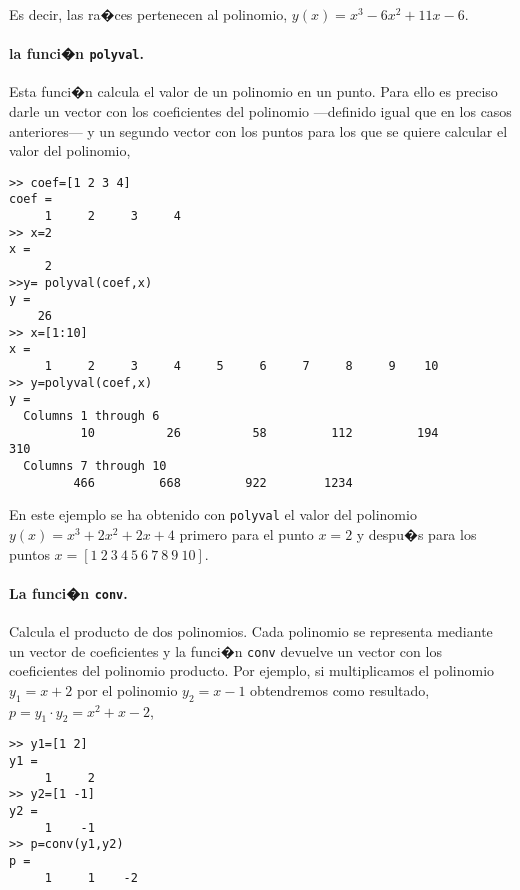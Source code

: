 Es decir, las ra�ces pertenecen al polinomio, $y(x)=x^3-6x^2+11x-6$.

\paragraph{la funci�n \texttt{polyval}.} Esta funci�n calcula el valor de un polinomio en un punto.  Para ello es preciso darle un vector con los coeficientes del polinomio ---definido igual que en los casos anteriores--- y un segundo vector con los puntos para los que se quiere calcular el valor del polinomio,

\begin{verbatim}
>> coef=[1 2 3 4]
coef =
     1     2     3     4
>> x=2
x =
     2
>>y= polyval(coef,x)
y =
    26
>> x=[1:10]
x =
     1     2     3     4     5     6     7     8     9    10
>> y=polyval(coef,x)
y =
  Columns 1 through 6
          10          26          58         112         194         310
  Columns 7 through 10
         466         668         922        1234
\end{verbatim}  
 

En este ejemplo se ha obtenido con \texttt{polyval} el valor del polinomio $y(x)=x^3+2x^2+2x+4$ primero para el punto $x=2$ y despu�s para los puntos $x=[1\ 2\ 3\ 4\ 5\ 6\ 7\ 8\ 9\ 10]$.

\paragraph{La funci�n \texttt{conv}.} Calcula el producto de dos polinomios. Cada polinomio se representa mediante un vector de coeficientes y la funci�n \texttt{conv} devuelve un vector con los coeficientes del polinomio producto. Por ejemplo, si multiplicamos   el polinomio $y_1=x+2$ por el polinomio $y_2=x-1$  obtendremos como resultado, $p=y_1\cdot y_2=x^2+x-2$,  

\begin{verbatim}
>> y1=[1 2]
y1 =
     1     2
>> y2=[1 -1]
y2 =
     1    -1
>> p=conv(y1,y2)
p =
     1     1    -2
\end{verbatim}

